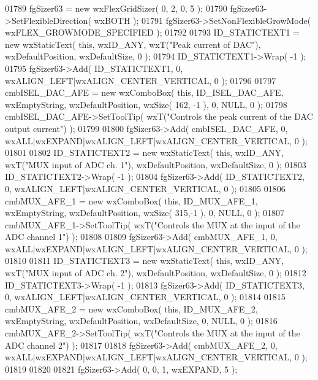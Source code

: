 \begin{DoxyCode}
01789     fgSizer63 = \textcolor{keyword}{new} wxFlexGridSizer( 0, 2, 0, 5 );
01790     fgSizer63->SetFlexibleDirection( wxBOTH );
01791     fgSizer63->SetNonFlexibleGrowMode( wxFLEX\_GROWMODE\_SPECIFIED );
01792     
01793     ID_STATICTEXT1 = \textcolor{keyword}{new} wxStaticText( \textcolor{keyword}{this}, wxID\_ANY, wxT(\textcolor{stringliteral}{"Peak current of DAC"}), wxDefaultPosition, 
      wxDefaultSize, 0 );
01794     ID_STATICTEXT1->Wrap( -1 );
01795     fgSizer63->Add( ID_STATICTEXT1, 0, wxALIGN\_LEFT|wxALIGN\_CENTER\_VERTICAL, 0 );
01796     
01797     cmbISEL_DAC_AFE = \textcolor{keyword}{new} wxComboBox( \textcolor{keyword}{this}, ID_ISEL_DAC_AFE, wxEmptyString, wxDefaultPosition, wxSize( 162,
      -1 ), 0, NULL, 0 ); 
01798     cmbISEL_DAC_AFE->SetToolTip( wxT(\textcolor{stringliteral}{"Controls the peak current of the DAC output current"}) );
01799     
01800     fgSizer63->Add( cmbISEL_DAC_AFE, 0, wxALL|wxEXPAND|wxALIGN\_LEFT|wxALIGN\_CENTER\_VERTICAL, 0 );
01801     
01802     ID_STATICTEXT2 = \textcolor{keyword}{new} wxStaticText( \textcolor{keyword}{this}, wxID\_ANY, wxT(\textcolor{stringliteral}{"MUX input of ADC ch. 1"}), wxDefaultPosition, 
      wxDefaultSize, 0 );
01803     ID_STATICTEXT2->Wrap( -1 );
01804     fgSizer63->Add( ID_STATICTEXT2, 0, wxALIGN\_LEFT|wxALIGN\_CENTER\_VERTICAL, 0 );
01805     
01806     cmbMUX_AFE_1 = \textcolor{keyword}{new} wxComboBox( \textcolor{keyword}{this}, ID_MUX_AFE_1, wxEmptyString, wxDefaultPosition, wxSize( 315,-1 ), 
      0, NULL, 0 ); 
01807     cmbMUX_AFE_1->SetToolTip( wxT(\textcolor{stringliteral}{"Controls the MUX at the input of the ADC channel 1"}) );
01808     
01809     fgSizer63->Add( cmbMUX_AFE_1, 0, wxALL|wxEXPAND|wxALIGN\_LEFT|wxALIGN\_CENTER\_VERTICAL, 0 );
01810     
01811     ID_STATICTEXT3 = \textcolor{keyword}{new} wxStaticText( \textcolor{keyword}{this}, wxID\_ANY, wxT(\textcolor{stringliteral}{"MUX input of ADC ch. 2"}), wxDefaultPosition, 
      wxDefaultSize, 0 );
01812     ID_STATICTEXT3->Wrap( -1 );
01813     fgSizer63->Add( ID_STATICTEXT3, 0, wxALIGN\_LEFT|wxALIGN\_CENTER\_VERTICAL, 0 );
01814     
01815     cmbMUX_AFE_2 = \textcolor{keyword}{new} wxComboBox( \textcolor{keyword}{this}, ID_MUX_AFE_2, wxEmptyString, wxDefaultPosition, wxDefaultSize, 0, 
      NULL, 0 ); 
01816     cmbMUX_AFE_2->SetToolTip( wxT(\textcolor{stringliteral}{"Controls the MUX at the input of the ADC channel 2"}) );
01817     
01818     fgSizer63->Add( cmbMUX_AFE_2, 0, wxALL|wxEXPAND|wxALIGN\_LEFT|wxALIGN\_CENTER\_VERTICAL, 0 );
01819     
01820     
01821     fgSizer63->Add( 0, 0, 1, wxEXPAND, 5 );

\end{DoxyCode}

